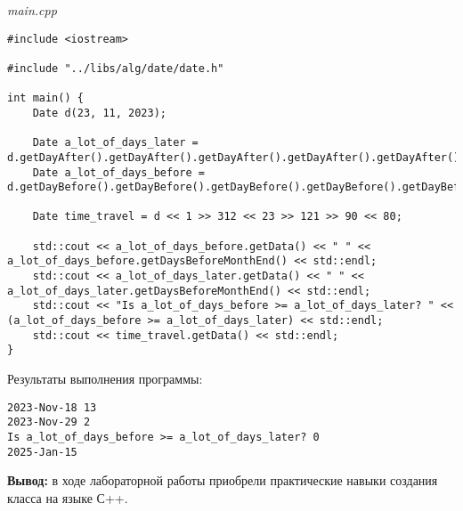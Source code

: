 \documentclass[a4paper,14pt]{extarticle}
\begin{document}
\textit{main.cpp}
\begin{verbatim}
#include <iostream>

#include "../libs/alg/date/date.h"

int main() {
    Date d(23, 11, 2023);

    Date a_lot_of_days_later = d.getDayAfter().getDayAfter().getDayAfter().getDayAfter().getDayAfter().getDayAfter();
    Date a_lot_of_days_before = d.getDayBefore().getDayBefore().getDayBefore().getDayBefore().getDayBefore();

    Date time_travel = d << 1 >> 312 << 23 >> 121 >> 90 << 80;

    std::cout << a_lot_of_days_before.getData() << " " << a_lot_of_days_before.getDaysBeforeMonthEnd() << std::endl;
    std::cout << a_lot_of_days_later.getData() << " " << a_lot_of_days_later.getDaysBeforeMonthEnd() << std::endl;
    std::cout << "Is a_lot_of_days_before >= a_lot_of_days_later? " << (a_lot_of_days_before >= a_lot_of_days_later) << std::endl;
    std::cout << time_travel.getData() << std::endl;
}

\end{verbatim}

Результаты выполнения программы:
\begin{verbatim}
2023-Nov-18 13
2023-Nov-29 2
Is a_lot_of_days_before >= a_lot_of_days_later? 0
2025-Jan-15
\end{verbatim}

\textbf{Вывод: } в ходе лабораторной работы приобрели практические навыки создания класса на
языке С++.
\end{document}
